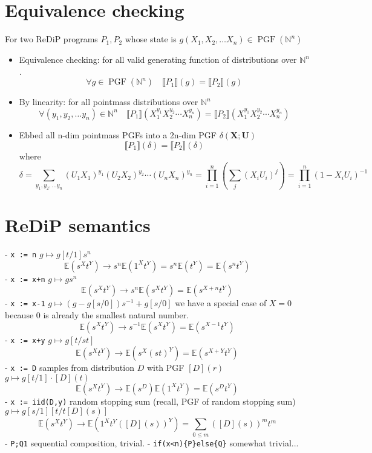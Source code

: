 \documentclass{article}
\renewcommand{\S}[1]{ \llbracket #1 \rrbracket }
\DeclareMathOperator*{\PGF}{PGF}
\begin{document}
\newpage

\section{Equivalence checking}

For two ReDiP programs \(P_1,P_2\) whose state is \(g(X_1,X_2,\ldots X_n)\in\PGF(\mathbb{N}^n)\)

\begin{itemize}
	\item Equivalence checking: for all valid generating function of distributions over \(\mathbb{N}^n\).
	      \[ \forall g \in\PGF(\mathbb{N}^n) \quad \S{P_1}(g) = \S{P_2}(g) \]
	\item By linearity: for all pointmass distributions over \(\mathbb{N}^n\)
	      \[ \forall (y_1,y_2,\ldots y_n) \in \mathbb{N}^n \quad \S{P_1}(X_1^{y_1}X_2^{y_2}\cdots X_n^{y_n}) = \S{P_2}(X_1^{y_1}X_2^{y_2}\cdots X_n^{y_n}) \]
	\item Ebbed all n-dim pointmass PGFs into a 2n-dim PGF \(\delta(\mathbf{X};\mathbf{U})\)
	      \[ \S{P_1}(\delta) = \S{P_2}(\delta) \]
	      where
	      \[
		      \delta
		      = \sum_{y_1,y_2,\ldots y_n} (U_1X_1)^{y_1}(U_2X_2)^{y_2}\cdots (U_nX_n)^{y_n}
		      = \prod_{i=1}^n \left( \sum_j (X_iU_i)^j \right)
		      = \prod_{i=1}^n (1-X_iU_i)^{-1}
	      \]
\end{itemize}

\newpage
\section{ReDiP semantics}

- \verb|x := n| $g\mapsto g[t/1] s^n$
$$
	\mathbb{E}(s^X t^Y) \to s^n \mathbb{E}(1^X t^Y) = s^n \mathbb{E}(t^Y) = \mathbb{E}(s^n t^Y)
$$
- \verb|x := x+n| $g\mapsto g s^n$
$$
	\mathbb{E}(s^X t^Y) \to s^n \mathbb{E}(s^X t^Y) = \mathbb{E}(s^{X+n} t^Y)
$$
- \verb|x := x-1| $g\mapsto (g-g[s/0])s^{-1} + g[s/0]$ we have a special case of $X=0$ because 0 is already the smallest natural number.
$$
	\mathbb{E}(s^X t^Y) \to s^{-1}\mathbb{E}(s^X t^Y) = \mathbb{E}(s^{X-1} t^Y)
$$
- \verb|x := x+y| $g\mapsto g[t/st]$
$$
	\mathbb{E}(s^X t^Y) \to \mathbb{E}(s^X (st)^Y) = \mathbb{E}(s^{X+Y} t^Y)
$$
- \verb|x := D| samples from distribution $D$ with PGF $[D](r)$ $g\mapsto g[t/1] \cdot [D](t)$
$$
	\mathbb{E}(s^X t^Y) \to \mathbb{E}(s^D) \mathbb{E}(1^X t^Y) = \mathbb{E}(s^D t^Y)
$$
- \verb|x := iid(D,y)| random stopping sum (recall, PGF of random stopping sum) $g\mapsto g[s/1][t/t[D](s)]$
$$
	\mathbb{E}(s^X t^Y) \to \mathbb{E}(1^X t^Y {([D](s))}^Y) = \sum_{0\leq m} {([D](s))}^m t^m
$$
- \verb|P;Q1| sequential composition, trivial.
- \verb|if(x<n){P}else{Q}| somewhat trivial...
\end{document}
